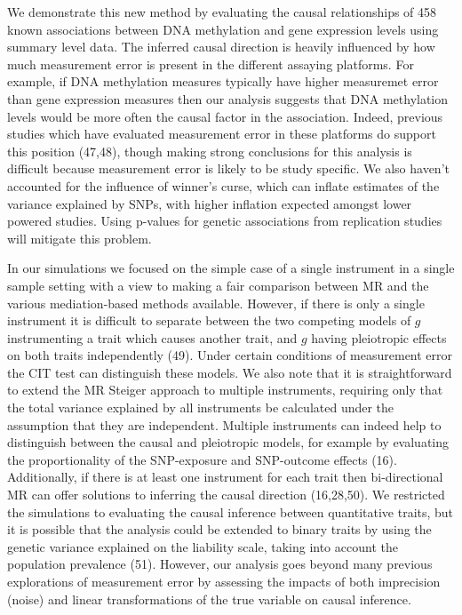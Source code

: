 \documentclass[]{article}
\begin{document}
We demonstrate this new method by evaluating the causal relationships of
458 known associations between DNA methylation and gene expression
levels using summary level data. The inferred causal direction is
heavily influenced by how much measurement error is present in the
different assaying platforms. For example, if DNA methylation measures
typically have higher measuremet error than gene expression measures
then our analysis suggests that DNA methylation levels would be more
often the causal factor in the association. Indeed, previous studies
which have evaluated measurement error in these platforms do support
this position (47,48), though making strong conclusions for this
analysis is difficult because measurement error is likely to be study
specific. We also haven't accounted for the influence of winner's curse,
which can inflate estimates of the variance explained by SNPs, with
higher inflation expected amongst lower powered studies. Using p-values
for genetic associations from replication studies will mitigate this
problem.

In our simulations we focused on the simple case of a single instrument
in a single sample setting with a view to making a fair comparison
between MR and the various mediation-based methods available. However,
if there is only a single instrument it is difficult to separate between
the two competing models of \(g\) instrumenting a trait which causes
another trait, and \(g\) having pleiotropic effects on both traits
independently (49). Under certain conditions of measurement error the
CIT test can distinguish these models. We also note that it is
straightforward to extend the MR Steiger approach to multiple
instruments, requiring only that the total variance explained by all
instruments be calculated under the assumption that they are
independent. Multiple instruments can indeed help to distinguish between
the causal and pleiotropic models, for example by evaluating the
proportionality of the SNP-exposure and SNP-outcome effects (16).
Additionally, if there is at least one instrument for each trait then
bi-directional MR can offer solutions to inferring the causal direction
(16,28,50). We restricted the simulations to evaluating the causal
inference between quantitative traits, but it is possible that the
analysis could be extended to binary traits by using the genetic
variance explained on the liability scale, taking into account the
population prevalence (51). However, our analysis goes beyond many
previous explorations of measurement error by assessing the impacts of
both imprecision (noise) and linear transformations of the true variable
on causal inference.
\end{document}
